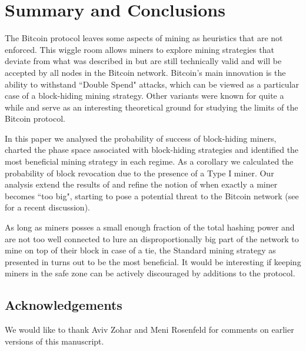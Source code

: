 \documentclass[letterpaper,12pt]{report}
\begin{document}
\noindent \begin{minipage}{\linewidth}
\label{fig:selfish}
\end{minipage}
\linebreak

\chapter{Summary and Conclusions}
The Bitcoin protocol leaves some aspects of mining as heuristics that are not enforced. This wiggle room allows miners to explore mining strategies that deviate from what was described in \cite{Bitcoin} but are still technically valid and will be accepted by all nodes in the Bitcoin network. Bitcoin's  main innovation is the ability to withstand ``Double Spend" attacks, which can be viewed as a particular case of a block-hiding mining strategy. Other variants were known for quite a while \cite{Lear,Selfish} and serve as an interesting theoretical ground for studying the limits of the Bitcoin protocol. 
 
In this paper we analysed the probability of success of block-hiding miners, charted the phase space  associated with block-hiding strategies and identified the most beneficial mining strategy in each regime. As a corollary we calculated the probability of block revocation due to the presence of a Type I miner. Our analysis extend the results of \cite{Selfish} and refine the notion of when exactly a miner becomes ``too big", starting to pose a potential threat to the Bitcoin network (see \cite{Centralization} for a recent discussion). 

As long as miners posses a small enough fraction of the total hashing power and are not too well connected to lure an disproportionally big part of the network to mine on top of their block in case of a tie, the Standard mining strategy as presented in \cite{Bitcoin} turns out to be the most beneficial. It would be interesting if keeping miners in the safe zone can be actively discouraged by additions to the protocol.

\section{Acknowledgements}
We would like to thank Aviv Zohar and Meni Rosenfeld for comments on earlier versions of this manuscript.
\end{document}

